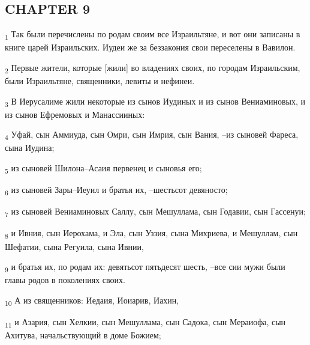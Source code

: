 \subsection{CHAPTER 9}
\begin{tcolorbox}
\textsubscript{1} Так были перечислены по родам своим все Израильтяне, и вот они записаны в книге царей Израильских. Иудеи же за беззакония свои переселены в Вавилон.
\end{tcolorbox}
\begin{tcolorbox}
\textsubscript{2} Первые жители, которые [жили] во владениях своих, по городам Израильским, были Израильтяне, священники, левиты и нефинеи.
\end{tcolorbox}
\begin{tcolorbox}
\textsubscript{3} В Иерусалиме жили некоторые из сынов Иудиных и из сынов Вениаминовых, и из сынов Ефремовых и Манассииных:
\end{tcolorbox}
\begin{tcolorbox}
\textsubscript{4} Уфай, сын Аммиуда, сын Омри, сын Имрия, сын Вания, --из сыновей Фареса, сына Иудина;
\end{tcolorbox}
\begin{tcolorbox}
\textsubscript{5} из сыновей Шилона--Асаия первенец и сыновья его;
\end{tcolorbox}
\begin{tcolorbox}
\textsubscript{6} из сыновей Зары--Иеуил и братья их, --шестьсот девяносто;
\end{tcolorbox}
\begin{tcolorbox}
\textsubscript{7} из сыновей Вениаминовых Саллу, сын Мешуллама, сын Годавии, сын Гассенуи;
\end{tcolorbox}
\begin{tcolorbox}
\textsubscript{8} и Ивния, сын Иерохама, и Эла, сын Уззия, сына Михриева, и Мешуллам, сын Шефатии, сына Регуила, сына Ивнии,
\end{tcolorbox}
\begin{tcolorbox}
\textsubscript{9} и братья их, по родам их: девятьсот пятьдесят шесть, --все сии мужи были главы родов в поколениях своих.
\end{tcolorbox}
\begin{tcolorbox}
\textsubscript{10} А из священников: Иедаия, Иоиарив, Иахин,
\end{tcolorbox}
\begin{tcolorbox}
\textsubscript{11} и Азария, сын Хелкии, сын Мешуллама, сын Садока, сын Мераиофа, сын Ахитува, начальствующий в доме Божием;
\end{tcolorbox}
